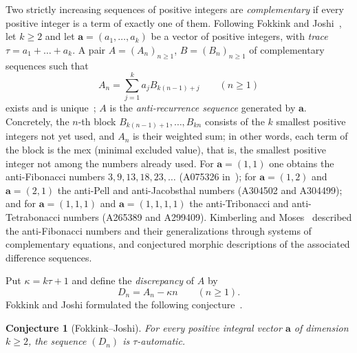 \documentclass{amsart}
\newtheorem{conjecture}[theorem]{Conjecture}
\theoremstyle{definition}
\theoremstyle{remark}
\numberwithin{equation}{section}
\numberwithin{table}{section}
\newcommand{\ba}{\mathbf{a}}
\begin{document}
Two strictly increasing sequences of positive integers are \emph{complementary} if every positive integer is a term of exactly one of them. Following Fokkink and Joshi~\cite{FJ}, let $k\ge2$ and let $\ba=(a_1,\dots,a_k)$ be a vector of positive integers, with \emph{trace} $\tau=a_1+\dots+a_k$. A pair $A=(A_n)_{n\ge1}$, $B=(B_n)_{n\ge1}$ of complementary sequences such that
\begin{equation}\label{eq:def}
A_n=\sum_{j=1}^{k}a_jB_{k(n-1)+j}\qquad(n\ge1)
\end{equation}
exists and is unique~\cite[Lemma~2]{FJ}; $A$ is the \emph{anti-recurrence sequence} generated by $\ba$. Concretely, the $n$-th block $B_{k(n-1)+1},\dots,B_{kn}$ consists of the $k$ smallest positive integers not yet used, and $A_n$ is their weighted sum; in other words, each term of the block is the mex (minimal excluded value), that is, the smallest positive integer not among the numbers already used. For $\ba=(1,1)$ one obtains the anti-Fibonacci numbers $3,9,13,18,23,\dots$ (A075326 in~\cite{OEIS}); for $\ba=(1,2)$ and $\ba=(2,1)$ the anti-Pell and anti-Jacobsthal numbers (A304502 and A304499); and for $\ba=(1,1,1)$ and $\ba=(1,1,1,1)$ the anti-Tribonacci and anti-Tetrabonacci numbers (A265389 and A299409). Kimberling and Moses~\cite[Section~6]{KM} described the anti-Fibonacci numbers and their generalizations through systems of complementary equations, and conjectured morphic descriptions of the associated difference sequences.

Put $\kappa=k\tau+1$ and define the \emph{discrepancy} of $A$ by
\[
D_n=A_n-\kappa n\qquad(n\ge1).
\]
Fokkink and Joshi formulated the following conjecture~\cite[Conjecture~2]{FJ}.

\begin{conjecture}[Fokkink--Joshi]\label{conj:FJ}
For every positive integral vector $\ba$ of dimension $k\ge2$, the sequence $(D_n)$ is $\tau$-automatic.
\end{conjecture}
\end{document}
